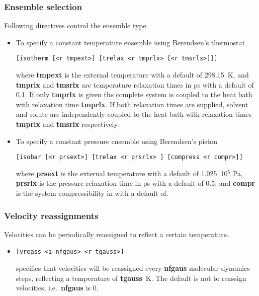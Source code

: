 \subsubsection{Ensemble selection}
Following directives control the ensemble type.
\begin{itemize}
\item
To specify a constant temperature ensemble using Berendsen's thermostat
\begin{verbatim}
[isotherm [<r tmpext>] [trelax <r tmprlx> [<r tmsrlx>]]]
\end{verbatim}
where {\bf tmpext} is the external temperature with a default of 298.15~K,
and {\bf tmprlx} and {\bf tmsrlx} are temperature relaxation times in ps 
with a default of 0.1. If only {\bf tmprlx} is given the complete system
is coupled to the heat bath with relaxation time {\bf tmprlx}. If both
relaxation times are supplied, solvent and solute are independently coupled
to the heat bath with relaxation times {\bf tmprlx} and {\bf tmsrlx}
respectively.
\item
To specify a constant pressure ensemble using Berendsen's piston
\begin{verbatim}
[isobar [<r prsext>] [trelax <r prsrlx> ] [compress <r compr>]]
\end{verbatim}
where {\bf prsext} is the external temperature with a default of 1.025~10$^5$ Pa,
{\bf prsrlx} is the pressure relaxation time in ps with a default of 0.5, and
{\bf compr} is the system compressibility in with a default of.
\end{itemize}
\subsubsection{Velocity reassignments}
Velocities can be periodically reassigned to reflect a certain temperature.
\begin{itemize}
\item
\begin{verbatim}
[vreass <i nfgaus> <r tgauss>]
\end{verbatim}
specifies that velocities will be reassigned every {\bf nfgaus} molecular
dynamics steps, reflecting a temperature of {\bf tgauss}~K. The default
is not to reassign velocities, i.e.\ {\bf nfgaus} is 0.
\end{itemize}
